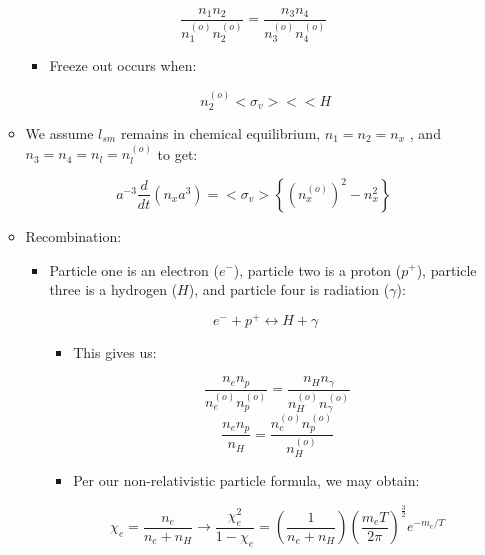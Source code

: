 \begin{itemize}
\begin{itemize}
        $$\frac{n_1n_2}{n_1^{(o)}n_2^{(o)}}=\frac{n_3n_4}{n_3^{(o)}n_4^{(o)}}$$

        \begin{itemize}

          \item Freeze out occurs when:

            $$n_2^{(o)}<\sigma_v> <<H$$

        \end{itemize}
        
      \item We assume $l_{sm}$ remains in chemical equilibrium, $n_1=n_2=n_x$ , and $n_3=n_4=n_l=n_l^{(o)}$ to get:

        $$a^{-3}\frac{d}{dt}(n_xa^{3})=<\sigma_v>\left\{ (n_x^{(o)})^2-n_x^2 \right\}$$

      \item Recombination:

        \begin{itemize}

          \item Particle one is an electron ($e^{-}$), particle two is a proton ($p^{+}$), particle three is a hydrogen ($H$), and particle four is radiation ($\gamma$):

            $$e^{-}+p^{+}\leftrightarrow H + \gamma$$

            \begin{itemize}

              \item This gives us:

                $$\frac{n_en_p}{n_e^{(o)}n_p^{(o)}}=\frac{n_Hn_{\gamma}}{n_H^{(o)}n_{\gamma}^{(o)}}$$
                $$\frac{n_en_p}{n_H}=\frac{n_e^{(o)}n_p^{(o)}}{n_H^{(o)}}$$

              \item Per our non-relativistic particle formula, we may obtain:

                $$\chi_e=\frac{n_e}{n_e+n_H}\to \frac{\chi_e^2}{1-\chi_e}=\left( \frac{1}{n_e+n_H} \right)\left( \frac{m_eT}{2\pi} \right)^{\frac{3}{2}}e^{-m_e/T}$$

            \end{itemize}

        \end{itemize}

    \end{itemize}

\end{itemize}



